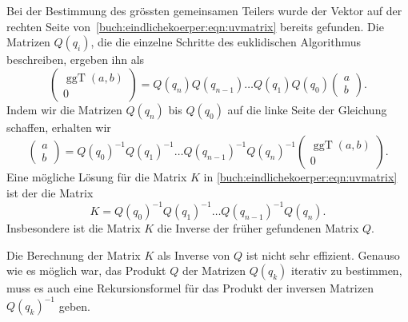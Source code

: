 Bei der Bestimmung des grössten gemeinsamen Teilers wurde der Vektor auf
der rechten Seite von~\eqref{buch:eindlichekoerper:eqn:uvmatrix} bereits
gefunden.
Die Matrizen $Q(q_i)$, die die einzelne Schritte des euklidischen
Algorithmus beschreiben, ergeben ihn als
\[
\begin{pmatrix}
\operatorname{ggT}(a,b)\\0
\end{pmatrix}
=
Q(q_n)Q(q_{n-1}) \dots Q(q_1)Q(q_0)
\begin{pmatrix}a\\b\end{pmatrix}.
\]
Indem wir die Matrizen $Q(q_n)$ bis $Q(q_0)$ auf die linke Seite der
Gleichung schaffen, erhalten wir
\[
\begin{pmatrix}a\\b\end{pmatrix}
=
Q(q_0)^{-1}
Q(q_1)^{-1}
\dots
Q(q_{n-1})^{-1}
Q(q_n)^{-1}
\begin{pmatrix}\operatorname{ggT}(a,b)\\0\end{pmatrix}.
\]
Eine mögliche Lösung für die Matrix $K$ in
\eqref{buch:eindlichekoerper:eqn:uvmatrix}
ist der die Matrix
\[
K
=
Q(q_0)^{-1}
Q(q_1)^{-1}
\dots
Q(q_{n-1})^{-1}
Q(q_n).
\]
Insbesondere ist die Matrix $K$ die Inverse der früher gefundenen
Matrix $Q$.

Die Berechnung der Matrix $K$ als Inverse von $Q$ ist nicht sehr
effizient.
Genauso wie es möglich war, das Produkt $Q$ der Matrizen
$Q(q_k)$ iterativ zu bestimmen, muss es auch eine Rekursionsformel
für das Produkt der inversen Matrizen $Q(q_k)^{-1}$ geben.

